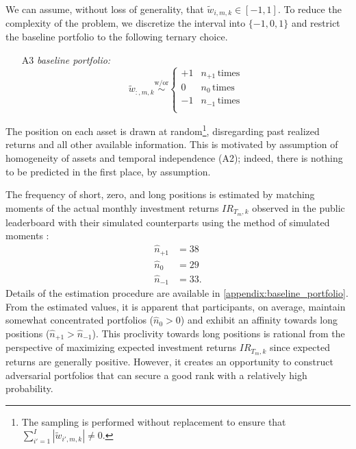 \documentclass[3p,times,twocolumn]{elsarticle}
\begin{document}
We can assume, without loss of generality, that $\tilde{w}_{i,m,k} \in [-1, 1]$.
To reduce the complexity of the problem, we discretize the interval into $\{-1, 0, 1\}$ and restrict the baseline portfolio to the following ternary choice.
\begin{itemize}
    \item[A3]  \emph{baseline portfolio:}
        \begin{equation}\label{eq:baseline_portfolio}
            \tilde{w}_{:,m,k} \overset{\mathrm{w/or}}{\sim} \begin{cases}
                +1 & n_{+1}\, \text{times} \\
                0  & n_{0}\, \text{times}  \\
                -1 & n_{-1}\, \text{times} \\
            \end{cases}
        \end{equation}
\end{itemize}
The position on each asset is drawn at random\footnote{The sampling is performed without replacement to ensure that $\sum_{i'=1}^{I}|\tilde{w}_{i',m,k}| \neq 0$.}, disregarding past realized returns and all other available information.
This is motivated by assumption of homogeneity of assets and temporal independence (A2); indeed, there is nothing to be predicted in the first place, by assumption.

The frequency of short, zero, and long positions is estimated by matching moments of the actual monthly investment returns $IR_{T_{m},k}$ observed in the public leaderboard with their simulated counterparts using the method of simulated moments \citep{mcfaddenMethodSimulatedMoments1989}:
\begin{equation}
    \begin{split}
        \hat{n}_{+1}&=38\\
        \hat{n}_{0}&=29\\
        \hat{n}_{-1}&=33.
    \end{split}
\end{equation}
Details of the estimation procedure are available in \ref{appendix:baseline_portfolio}.
From the estimated values, it is apparent that participants, on average, maintain somewhat concentrated portfolios ($\hat{n}_{0} > 0$) and exhibit an affinity towards long positions ($\hat{n}_{+1} > \hat{n}_{-1}$).
This proclivity towards long positions is rational from the perspective of maximizing expected investment returns $IR_{T_{m},k}$ since expected returns are generally positive.
However, it creates an opportunity to construct adversarial portfolios that can secure a good rank with a relatively high probability.
\end{document}
